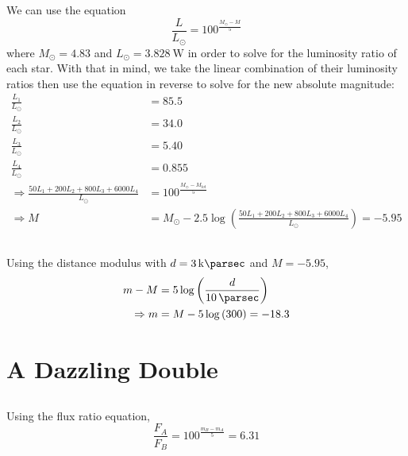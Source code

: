 \documentclass{article}
\begin{document}
\subsection{}

We can use the equation
\begin{equation} \label{eq:2b}
    \frac{L}{L_\odot} = 100^{\frac{M_\odot - M}{5}}
\end{equation}
where \(M_\odot = \num{4.83}\) and \(L_\odot = \SI{3.828}{\watt}\) in order to solve for the luminosity ratio of each star.
With that in mind, we take the linear combination of their luminosity ratios then use the equation in reverse to solve for the new absolute magnitude:
\begin{align}
    \frac{L_1}{L_\odot} &= \num{85.5} \\
    \frac{L_2}{L_\odot} &= \num{34.0} \\
    \frac{L_3}{L_\odot} &= \num{5.40} \\
    \frac{L_4}{L_\odot} &= \num{0.855} \\
    \Rightarrow \frac{50 L_1 + 200 L_2 + 800 L_3 + 6000 L_4}{L_\odot} &= 100^{\frac{M_\odot - M_{tot}}{5}} \\
    \Rightarrow M &= M_\odot - 2.5 \log\left(\frac{50 L_1 + 200 L_2 + 800 L_3 + 6000 L_4}{L_\odot}\right) = \num{-5.95}
\end{align}

\subsection{}

Using the distance modulus with \(d = \SI{3}{\kilo\parsec}\) and \(M = \num{-5.95}\),
\begin{align}
    m - M &= 5 \log\left(\frac{d}{\SI{10}{\parsec}}\right) \\
    \Rightarrow m &= M - 5 \log\left(300\right) = \num{-18.3}
\end{align}

\section{A Dazzling Double}

\subsection{}

Using the flux ratio equation,
\begin{equation}
    \frac{F_A}{F_B} = 100^{\frac{m_B - m_A}{5}} = \num{6.31}
\end{equation}
\end{document}

